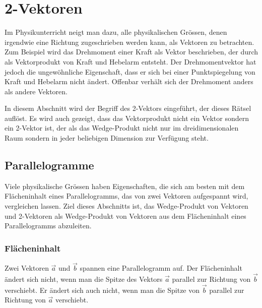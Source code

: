 %
%
\section{2-Vektoren
\label{buch:green:section:2vektoren}}
Im Physikunterricht neigt man dazu, alle physikalischen Grössen,
denen irgendwie eine Richtung zugeschrieben werden kann, als
Vektoren zu betrachten.
Zum Beispiel wird das Drehmoment einer Kraft als Vektor beschrieben,
der durch als Vektorprodukt von Kraft und Hebelarm entsteht.
%
Der Drehmomentvektor hat jedoch die ungewöhnliche Eigenschaft, dass
er sich bei einer Punktspiegelung von Kraft und Hebelarm nicht ändert.
Offenbar verhält sich der Drehmoment anders als andere Vektoren.
%
%

In diesem Abschnitt wird der Begriff des 2-Vektors eingeführt, der
dieses Rätsel auflöst.
Es wird auch gezeigt, dass das Vektorprodukt nicht ein Vektor sondern
ein 2-Vektor ist, der als das Wedge-Produkt nicht nur im dreidimensionalen
%
Raum sondern in jeder beliebigen Dimension zur Verfügung steht.

%
%
\subsection{Parallelogramme}
%
Viele physikalische Grössen haben Eigenschaften, die sich am besten
mit dem Flächeninhalt eines Parallelogramms, das von zwei Vektoren
aufgespannt wird, vergleichen lassen.
Ziel dieses Abschnitts ist, das Wedge-Produkt von Vektoren und 
2-Vektoren als Wedge-Produkt von Vektoren aus dem Flächeninhalt
eines Parallelogramms abzuleiten.

%
%
\subsubsection{Flächeninhalt}

Zwei Vektoren $\vec{a}$ und $\vec{b}$ spannen eine Parallelogramm auf.
Der Flächeninhalt ändert sich nicht, wenn man die Spitze des Vektors
$\vec{a}$ parallel zur Richtung von $\vec{b}$ verschiebt.
%
Er ändert sich auch nicht, wenn man die Spitze von $\vec{b}$ parallel
zur Richtung von $\vec{a}$ verschiebt.

